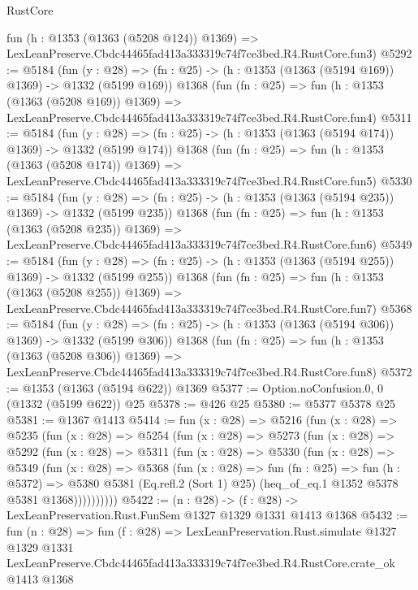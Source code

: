 \begin{lexlean}{RustCore}
\begin{coremodule}
    fun (h : @1353 (@1363 (@5208 @124)) @1369) =>
    LexLeanPreserve.Cbdc44465fad413a333319c74f7ce3bed.R4.RustCore.fun3)
@5292 := @5184
    (fun (y : @28) => (fn : @25) -> (h : @1353 (@1363 (@5194 @169)) @1369) -> @1332 (@5199 @169))
    @1368
    (fun (fn : @25) =>
    fun (h : @1353 (@1363 (@5208 @169)) @1369) =>
    LexLeanPreserve.Cbdc44465fad413a333319c74f7ce3bed.R4.RustCore.fun4)
@5311 := @5184
    (fun (y : @28) => (fn : @25) -> (h : @1353 (@1363 (@5194 @174)) @1369) -> @1332 (@5199 @174))
    @1368
    (fun (fn : @25) =>
    fun (h : @1353 (@1363 (@5208 @174)) @1369) =>
    LexLeanPreserve.Cbdc44465fad413a333319c74f7ce3bed.R4.RustCore.fun5)
@5330 := @5184
    (fun (y : @28) => (fn : @25) -> (h : @1353 (@1363 (@5194 @235)) @1369) -> @1332 (@5199 @235))
    @1368
    (fun (fn : @25) =>
    fun (h : @1353 (@1363 (@5208 @235)) @1369) =>
    LexLeanPreserve.Cbdc44465fad413a333319c74f7ce3bed.R4.RustCore.fun6)
@5349 := @5184
    (fun (y : @28) => (fn : @25) -> (h : @1353 (@1363 (@5194 @255)) @1369) -> @1332 (@5199 @255))
    @1368
    (fun (fn : @25) =>
    fun (h : @1353 (@1363 (@5208 @255)) @1369) =>
    LexLeanPreserve.Cbdc44465fad413a333319c74f7ce3bed.R4.RustCore.fun7)
@5368 := @5184
    (fun (y : @28) => (fn : @25) -> (h : @1353 (@1363 (@5194 @306)) @1369) -> @1332 (@5199 @306))
    @1368
    (fun (fn : @25) =>
    fun (h : @1353 (@1363 (@5208 @306)) @1369) =>
    LexLeanPreserve.Cbdc44465fad413a333319c74f7ce3bed.R4.RustCore.fun8)
@5372 := @1353 (@1363 (@5194 @622)) @1369
@5377 := Option.noConfusion.{0, 0} (@1332 (@5199 @622)) @25
@5378 := @426 @25
@5380 := @5377 @5378 @25
@5381 := @1367 @1413
@5414 := fun (x : @28) =>
  @5216
    (fun (x : @28) =>
    @5235
      (fun (x : @28) =>
      @5254
        (fun (x : @28) =>
        @5273
          (fun (x : @28) =>
          @5292
            (fun (x : @28) =>
            @5311
              (fun (x : @28) =>
              @5330
                (fun (x : @28) =>
                @5349
                  (fun (x : @28) =>
                  @5368
                    (fun (x : @28) =>
                    fun (fn : @25) =>
                    fun (h : @5372) =>
                    @5380
                      @5381
                      (Eq.refl.{2} (Sort 1) @25)
                      (heq_of_eq.{1} @1352 @5378 @5381 @1368))))))))))
@5422 := (n : @28) -> (f : @28) -> LexLeanPreservation.Rust.FunSem @1327 @1329 @1331 @1413 @1368
@5432 := fun (n : @28) =>
  fun (f : @28) =>
  LexLeanPreservation.Rust.simulate
    @1327
    @1329
    @1331
    LexLeanPreserve.Cbdc44465fad413a333319c74f7ce3bed.R4.RustCore.crate_ok
    @1413
    @1368
\end{coremodule}
\end{lexlean}
